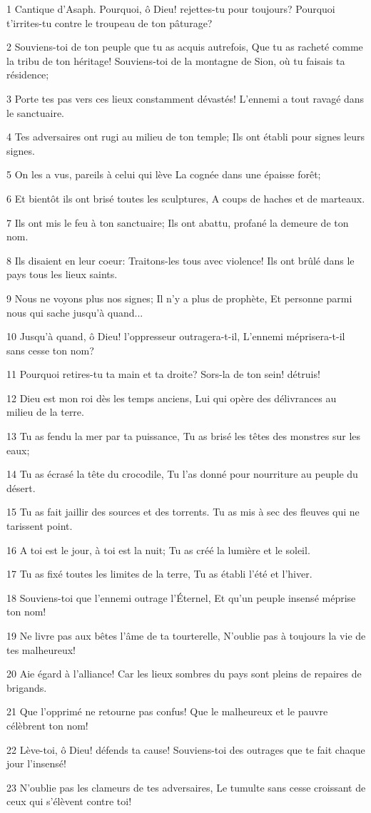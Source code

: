 \par 1 Cantique d'Asaph. Pourquoi, ô Dieu! rejettes-tu pour toujours? Pourquoi t'irrites-tu contre le troupeau de ton pâturage?
\par 2 Souviens-toi de ton peuple que tu as acquis autrefois, Que tu as racheté comme la tribu de ton héritage! Souviens-toi de la montagne de Sion, où tu faisais ta résidence;
\par 3 Porte tes pas vers ces lieux constamment dévastés! L'ennemi a tout ravagé dans le sanctuaire.
\par 4 Tes adversaires ont rugi au milieu de ton temple; Ils ont établi pour signes leurs signes.
\par 5 On les a vus, pareils à celui qui lève La cognée dans une épaisse forêt;
\par 6 Et bientôt ils ont brisé toutes les sculptures, A coups de haches et de marteaux.
\par 7 Ils ont mis le feu à ton sanctuaire; Ils ont abattu, profané la demeure de ton nom.
\par 8 Ils disaient en leur coeur: Traitons-les tous avec violence! Ils ont brûlé dans le pays tous les lieux saints.
\par 9 Nous ne voyons plus nos signes; Il n'y a plus de prophète, Et personne parmi nous qui sache jusqu'à quand...
\par 10 Jusqu'à quand, ô Dieu! l'oppresseur outragera-t-il, L'ennemi méprisera-t-il sans cesse ton nom?
\par 11 Pourquoi retires-tu ta main et ta droite? Sors-la de ton sein! détruis!
\par 12 Dieu est mon roi dès les temps anciens, Lui qui opère des délivrances au milieu de la terre.
\par 13 Tu as fendu la mer par ta puissance, Tu as brisé les têtes des monstres sur les eaux;
\par 14 Tu as écrasé la tête du crocodile, Tu l'as donné pour nourriture au peuple du désert.
\par 15 Tu as fait jaillir des sources et des torrents. Tu as mis à sec des fleuves qui ne tarissent point.
\par 16 A toi est le jour, à toi est la nuit; Tu as créé la lumière et le soleil.
\par 17 Tu as fixé toutes les limites de la terre, Tu as établi l'été et l'hiver.
\par 18 Souviens-toi que l'ennemi outrage l'Éternel, Et qu'un peuple insensé méprise ton nom!
\par 19 Ne livre pas aux bêtes l'âme de ta tourterelle, N'oublie pas à toujours la vie de tes malheureux!
\par 20 Aie égard à l'alliance! Car les lieux sombres du pays sont pleins de repaires de brigands.
\par 21 Que l'opprimé ne retourne pas confus! Que le malheureux et le pauvre célèbrent ton nom!
\par 22 Lève-toi, ô Dieu! défends ta cause! Souviens-toi des outrages que te fait chaque jour l'insensé!
\par 23 N'oublie pas les clameurs de tes adversaires, Le tumulte sans cesse croissant de ceux qui s'élèvent contre toi!

